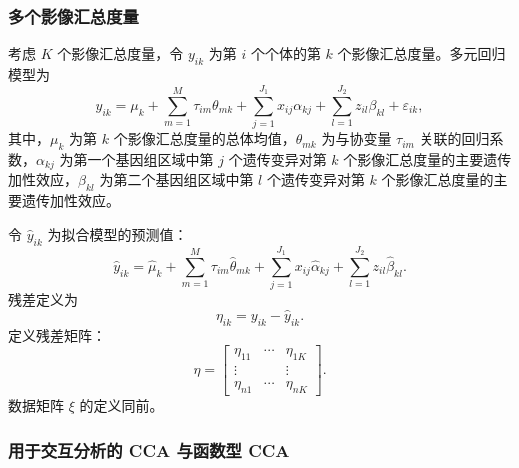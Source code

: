 \subsubsection{多个影像汇总度量}

考虑 $K$ 个影像汇总度量，令 $y_{ik}$ 为第 $i$ 个个体的第 $k$ 个影像汇总度量。多元回归模型为
\begin{equation}
y_{ik}=\mu_k+\sum_{m=1}^M\tau_{im}\theta_{mk}+\sum_{j=1}^{J_1}x_{ij}\alpha_{kj}+\sum_{l=1}^{J_2}z_{il}\beta_{kl}+\varepsilon_{ik},
\tag{6.193}
\end{equation}
其中，$\mu_k$ 为第 $k$ 个影像汇总度量的总体均值，$\theta_{mk}$ 为与协变量 $\tau_{im}$ 关联的回归系数，$\alpha_{kj}$ 为第一个基因组区域中第 $j$ 个遗传变异对第 $k$ 个影像汇总度量的主要遗传加性效应，$\beta_{kl}$ 为第二个基因组区域中第 $l$ 个遗传变异对第 $k$ 个影像汇总度量的主要遗传加性效应。

令 $\widehat y_{ik}$ 为拟合模型的预测值：
\[
\widehat y_{ik}=\widehat\mu_k+\sum_{m=1}^M\tau_{im}\widehat\theta_{mk}+\sum_{j=1}^{J_1}x_{ij}\widehat\alpha_{kj}+\sum_{l=1}^{J_2}z_{il}\widehat\beta_{kl}.
\]
残差定义为
\[
\eta_{ik}=y_{ik}-\widehat y_{ik}.
\]
定义残差矩阵：
\begin{equation}
\eta=\begin{bmatrix}\eta_{11}&\cdots&\eta_{1K}\\\vdots&&\vdots\\\eta_{n1}&\cdots&\eta_{nK}\end{bmatrix}.
\tag{6.194}
\end{equation}
数据矩阵 $\xi$ 的定义同前。

\subsubsection{用于交互分析的 CCA 与函数型 CCA}

